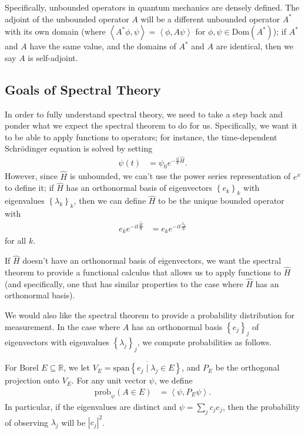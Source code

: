 \documentclass[12pt]{extarticle}
\newcommand{\R}{\mathbb{R}}
\newcommand{\set}[1]{\left\{#1\right\}}
\newcommand{\iprod}[2]{\left\langle #1,#2\right\rangle}
\theoremstyle{plain}
\theoremstyle{definition}
\theoremstyle{remark}
\renewcommand{\newline}{\hfill\break}
\begin{document}
  Specifically, unbounded operators in quantum mechanics are densely defined. The adjoint of the unbounded operator $A$ will be a different unbounded operator $A^{\ast}$ with its own domain (where $\iprod{A^{\ast}\phi}{\psi} = \iprod{\phi}{A\psi}$ for $\phi,\psi \in \text{Dom}(A^{\ast})$); if $A^{\ast}$ and $A$ have the same value, and the domains of $A^{\ast}$ and $A$ are identical, then we say $A$ is self-adjoint.
  \subsection{Goals of Spectral Theory}%
  In order to fully understand spectral theory, we need to take a step back and ponder what we expect the spectral theorem to do for us. Specifically, we want it to be able to apply functions to operators; for instance, the time-dependent Schrödinger equation is solved by setting
  \begin{align*}
    \psi(t) &= \psi_0e^{-\frac{it}{\hbar}\hat{H}}.
  \end{align*}
  However, since $\hat{H}$ is unbounded, we can't use the power series representation of $e^{x}$ to define it; if $\hat{H}$ has an orthonormal basis of eigenvectors $\set{e_k}_{k}$ with eigenvalues $\set{\lambda_k}_k$, then we can define $\hat{H}$ to be the unique bounded operator with
  \begin{align*}
    e_ke^{-it\frac{\hat{H}}{\hbar}} &= e_ke^{-it\frac{\lambda_k}{\hbar}}
  \end{align*}
  for all $k$.\newline

  If $\hat{H}$ doesn't have an orthonormal basis of eigenvectors, we want the spectral theorem to provide a functional calculus that allows us to apply functions to $\hat{H}$ (and specifically, one that has similar properties to the case where $\hat{H}$ has an orthonormal basis).\newline

  We would also like the spectral theorem to provide a probability distribution for measurement. In the case where $A$ has an orthonormal basis $\set{e_j}_j$ of eigenvectors with eigenvalues $\set{\lambda_j}_j$, we compute probabilities as follows. \newline

  For Borel $E\subseteq \R$, we let $V_E = \overline{\text{span}\set{e_j\mid \lambda_j\in E}}$, and $P_E$ be the orthogonal projection onto $V_E$. For any unit vector $\psi$, we define
  \begin{align*}
    \text{prob}_{\psi}(A\in E) &= \iprod{\psi}{P_E\psi}.
  \end{align*}
  In particular, if the eigenvalues are distinct and $\psi = \sum_{j}c_je_j$, then the probability of observing $\lambda_j$ will be $|c_j|^2$.\newline
\end{document}
